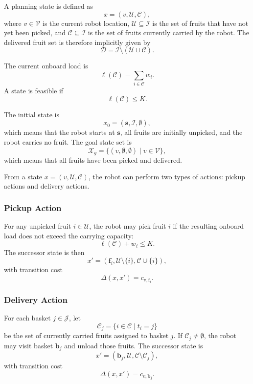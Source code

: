 A planning state is defined as
\[
    x=(v,\mathcal{U},\mathcal{C}),
\]
where $v\in\mathcal{V}$ is the current robot location, $\mathcal{U}\subseteq\mathcal{I}$ is the set of fruits that have not yet been picked, and $\mathcal{C}\subseteq\mathcal{I}$ is the set of fruits currently carried by the robot. The delivered fruit set is therefore implicitly given by
\[
    \mathcal{D}
    =
    \mathcal{I}
    \setminus
    (\mathcal{U}\cup\mathcal{C}).
\]

The current onboard load is
\begin{equation}
    \ell(\mathcal{C})
    =
    \sum_{i\in\mathcal{C}} w_i.
    \label{eq:onboard_load}
\end{equation}
A state is feasible if
\[
    \ell(\mathcal{C}) \leq K.
\]

The initial state is
\[
    x_0
    =
    (\mathbf{s},\mathcal{I},\emptyset),
\]
which means that the robot starts at $\mathbf{s}$, all fruits are initially unpicked, and the robot carries no fruit. The goal state set is
\[
    \mathcal{X}_{g}
    =
    \{(v,\emptyset,\emptyset)\mid v\in\mathcal{V}\},
\]
which means that all fruits have been picked and delivered.

From a state $x=(v,\mathcal{U},\mathcal{C})$, the robot can perform two types of actions: pickup actions and delivery actions.

\subsubsection{Pickup Action}

For any unpicked fruit $i\in\mathcal{U}$, the robot may pick fruit $i$ if the resulting onboard load does not exceed the carrying capacity:
\[
    \ell(\mathcal{C}) + w_i \leq K.
\]
The successor state is then
\[
    x'
    =
    (\mathbf{f}_i,
    \mathcal{U}\setminus\{i\},
    \mathcal{C}\cup\{i\}),
    \label{eq:pickup_successor}
\]
with transition cost
\[
    \Delta(x,x') = c_{v,\mathbf{f}_i}.
\]

\subsubsection{Delivery Action}

For each basket $j\in\mathcal{J}$, let
\[
    \mathcal{C}_j
    =
    \{i\in\mathcal{C}\mid t_i=j\}
\]
be the set of currently carried fruits assigned to basket $j$. If $\mathcal{C}_j\neq\emptyset$, the robot may visit basket $\mathbf{b}_j$ and unload those fruits. The successor state is
\[
    x'
    =
    (\mathbf{b}_j,
    \mathcal{U},
    \mathcal{C}\setminus\mathcal{C}_j),
    \label{eq:delivery_successor}
\]
with transition cost
\[
    \Delta(x,x') = c_{v,\mathbf{b}_j}.
\]

